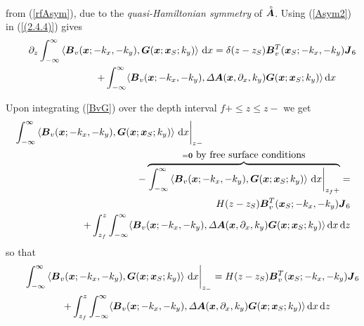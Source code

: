 from (\ref{rfAsym}),
due to the {\em quasi-Hamiltonian symmetry\/} of $\stackrel{\scriptscriptstyle _{\,\,\circ}}{ \mbox{\boldmath$\mit A$\unboldmath}}$. Using 
(\ref{Asym2}) in (\ref{(2.4.4)}) gives
\begin{eqnarray} \label{BvG} 
\lefteqn{{\partial }_{z} \int_{-\infty}^{\infty} \left\langle{  {\bmi B}_{v}({\bmi x};-k_x,-k_y),  
{\bmi G}({\bmi  x} ; {\bmi  x}_{ S};k_y)
}\right\rangle \,{\rm d}x  =\delta (z-{z}_{S}) 
{\bmi B}{}_{v}^{T}({\bmi x}_{S};-k_x,-k_y)
{\bmi  J}_{6}
}\nonumber\\
&&
\qquad\qquad\qquad+ 
\int_{-\infty}^{\infty} \langle{\bmi B}_{v}({\bmi x};-k_x,-k_y), {\mit \Delta}
{\bmi A}({\bmi x},{\partial}_{x}, k_y) {\bmi G}({\bmi  x} ; {\bmi  x}_{ S};k_y) \rangle \,{\rm d}x
\end{eqnarray} 




Upon integrating  (\ref{BvG}) over the depth interval 
$f+ \le z \le z-$ we get 
\begin{eqnarray*}  
\lefteqn{{\left.\int_{-\infty}^{\infty} \left\langle{  {\bmi B}_{v}({\bmi x};-k_x,-k_y),  
{\bmi G}({\bmi  x} ; {\bmi  x}_{ S};k_y)
}\right\rangle \,{\rm d}x \right|_{{z}-}}}\\
&&\qquad\qquad\qquad
-\overbrace{\left.\int_{-\infty}^{\infty} \left\langle{  {\bmi B}_{v}({\bmi x};-k_x,-k_y),  
{\bmi G}({\bmi  x} ; {\bmi  x}_{ S};k_y)
}\right\rangle \,{\rm d}x \right|_{{z}_{f}+}}^{={\bf 0} \ \mbox{by 
free surface conditions}}=\\
&&
H(z-{z}_{S}) {\bmi B}{}_{v}^{T}({\bmi x}_{S};-k_x,-k_y)
{\bmi  J}_{6}  \\
&&\qquad\qquad\qquad
+\int_{z_f}^{z}
\int_{-\infty}^{\infty} \langle{\bmi B}_{v}({\bmi x};-k_x,-k_y), {\mit \Delta}
{\bmi A}({\bmi x},{\partial}_{x}, k_y) {\bmi G}({\bmi  x} ; {\bmi  x}_{ S};k_y) \rangle 
\,{\rm d}x\,{\rm d}z
\end{eqnarray*} 
so that
\begin{eqnarray}  \label{(2.4.5)}
\lefteqn{\!\!\!\!\!\!
\left.\int_{-\infty}^{\infty} \left\langle{  {\bmi B}_{v}({\bmi x};-k_x,-k_y),  
{\bmi G}({\bmi  x} ; {\bmi  x}_{ S};k_y)
}\right\rangle \,{\rm d}x \right|_{{z}_{-}}=H(z-{z}_{S}) {\bmi B}{}_{v}^{T}({\bmi x}_{S};-k_x,-k_y)
{\bmi  J}_{6}}\nonumber\\
&&\qquad
+\int_{z_f}^{z}
\int_{-\infty}^{\infty} \langle{\bmi B}_{v}({\bmi x};-k_x,-k_y), {\mit \Delta}
{\bmi A}({\bmi x},{\partial}_{x}, k_y) {\bmi G}({\bmi  x} ; {\bmi  x}_{ S};k_y) \rangle 
\,{\rm d}x\,{\rm d}z
\end{eqnarray} 
